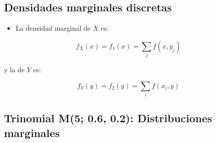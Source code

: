 \documentclass[
  a4paper,
  DIV=11,
  numbers=noendperiod]{scrreprt}
\providecommand{\tightlist}{%
  \setlength{\itemsep}{0pt}\setlength{\parskip}{0pt}}\usepackage{longtable,booktabs,array}
\begin{document}
\subsection{Densidades marginales
discretas}\label{densidades-marginales-discretas}

\begin{itemize}
\tightlist
\item
  La densidad marginal de \(X\) es:
\end{itemize}

\[
f_X(x) = f_1(x) = \sum_j f(x, y_j)
\]

y la de \(Y\) es:

\[
f_Y(y) = f_2(y) = \sum_i f(x_i, y)
\]

\subsection{Trinomial M(5; 0.6, 0.2): Distribuciones
marginales}\label{trinomial-m5-0.6-0.2-distribuciones-marginales}
\end{document}
